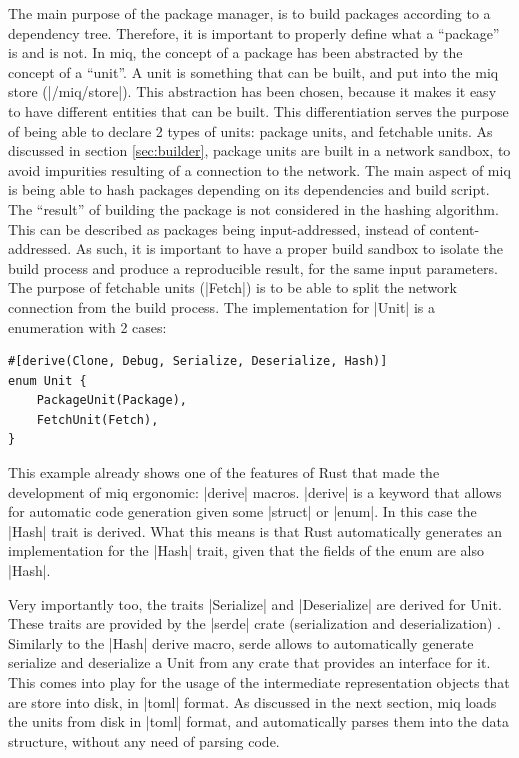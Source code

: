 The main purpose of the package manager, is to build
packages according to a dependency tree. Therefore, it is
important to properly define what a ``package'' is and is
not. In miq, the concept of a package has been abstracted by
the concept of a ``unit''. A unit is something that can be
built, and put into the miq store (|/miq/store|). This
abstraction has been chosen, because it makes it easy to
have different entities that can be built. This
differentiation serves the purpose of being able to declare
2 types of units: package units, and fetchable units.
As discussed in section \ref{sec:builder}, package units are
built in a network sandbox, to avoid impurities resulting of
a connection to the network. The main aspect of miq is being
able to hash packages depending on its dependencies and
build script. The ``result'' of building the package is not
considered in the hashing algorithm. This can be described
as packages being input-addressed, instead of
content-addressed. As such, it is important to have a proper
build sandbox to isolate the build process and produce a
reproducible result, for the same input parameters. The
purpose of fetchable units (|Fetch|) is to be able to split
the network connection from the build process. The
implementation for |Unit| is a enumeration with 2 cases:

\begin{verbatim}
#[derive(Clone, Debug, Serialize, Deserialize, Hash)]
enum Unit {
    PackageUnit(Package),
    FetchUnit(Fetch),
}
\end{verbatim}

This example already shows one of the features of Rust that
made the development of miq ergonomic: |derive| macros.
|derive| is a keyword that allows for automatic code
generation given some |struct| or |enum|. In this case the
|Hash| trait is derived. What this means is that Rust
automatically generates an implementation for the |Hash|
trait, given that the fields of the enum are also |Hash|.

Very importantly too, the traits |Serialize| and
|Deserialize| are derived for Unit. These traits are
provided by the |serde| crate (serialization and
deserialization) \cite{Serde} . Similarly to the |Hash|
derive macro, serde allows to automatically generate
serialize and deserialize a Unit from any crate that
provides an interface for it. This comes into play for the
usage of the intermediate representation objects that are
store into disk, in |toml| format. As discussed in the next
section, miq loads the units from disk in |toml| format, and
automatically parses them into the data structure, without
any need of parsing code.

